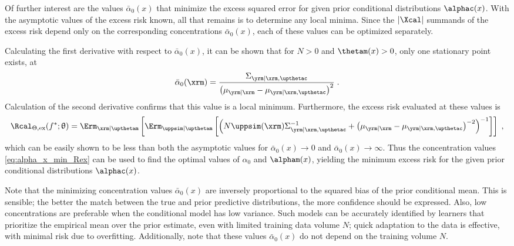 \documentclass[12pt]{report}
\newcommand{\todomid}[1]{\todo[inline,color=yellow!50,linecolor=red]{#1}}
\begin{document}
Of further interest are the values $\bar{\alpha}_0(x)$ that minimize the excess squared error for given prior conditional distributions $\alphac(x)$. With the asymptotic values of the excess risk known, all that remains is to determine any local minima. Since the $|\Xcal|$ summands of the excess risk depend only on the corresponding concentrations $\bar{\alpha}_0(x)$, each of these values can be optimized separately. 

\todomid{add the derivative details below???}

Calculating the first derivative with respect to $\bar{\alpha}_0(x)$, it can be shown that for $N > 0$ and $\thetam(x) > 0$, only one stationary point exists, at 
\begin{equation} \label{eq:alpha_x_min_Rex}
\bar{\alpha}_0(\xrm) = \frac{\Sigma_{\yrm | \xrm,\upthetac}}{\left( \mu_{\yrm | \xrm} - \mu_{\yrm | \xrm,\upthetac} \right)^2} \;.
\end{equation}
Calculation of the second derivative confirms that this value is a local minimum. Furthermore, the excess risk evaluated at these values is 
\begin{equation}
\Rcal_{\Theta, \mathrm{ex}}(f^* ; \uptheta) = \Erm_{\xrm | \upthetam}\left[ \Erm_{\uppsim | \upthetam}\left[ \left( N \uppsim(\xrm) \Sigma_{\yrm | \xrm,\upthetac}^{-1} + \left( \mu_{\yrm | \xrm} - \mu_{\yrm | \xrm,\upthetac} \right)^{-2} \right)^{-1} \right] \right] \;,
\end{equation}
which can be easily shown to be less than both the asymptotic values for $\bar{\alpha}_0(x) \to 0$ and $\bar{\alpha}_0(x) \to \infty$. Thus the concentration values \eqref{eq:alpha_x_min_Rex} can be used to find the optimal values of $\alpha_0$ and $\alpham(x)$, yielding the minimum excess risk for the given prior conditional distributions $\alphac(x)$.

Note that the minimizing concentration values $\bar{\alpha}_0(x)$ are inversely proportional to the squared bias of the prior conditional mean. This is sensible; the better the match between the true and prior predictive distributions, the more confidence should be expressed. Also, low concentrations are preferable when the conditional model has low variance. Such models can be accurately identified by learners that prioritize the empirical mean over the prior estimate, even with limited training data volume $N$; quick adaptation to the data is effective, with minimal risk due to overfitting. Additionally, note that these values $\bar{\alpha}_0(x)$ do not depend on the training volume $N$.
\end{document}
